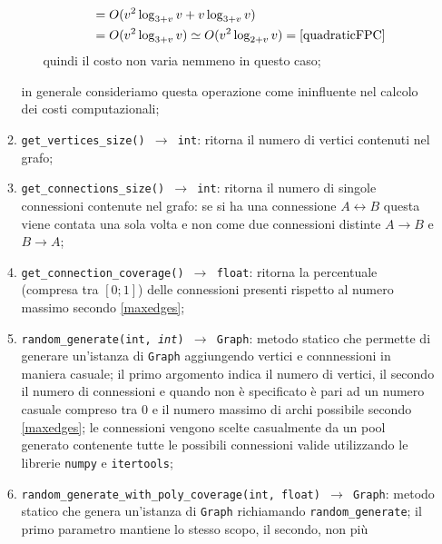 \begin{enumerate}
\begin{enumerate}[resume]
\begin{itemize}
\begin{equation}
\begin{aligned}
                                                                   & = O(v^2\log_{3+v}v+ v\log_{3+v}v)                                   \\
                                                                   & = O(v^2\log_{3+v}v) \simeq O(v^2\log_{2+v}v) = \eqref{quadraticFPC}
                                          \end{aligned}
                                    \end{equation}
                                    quindi il costo non varia nemmeno in questo caso;
                        \end{itemize}
                        in generale consideriamo questa operazione come ininfluente nel calcolo dei costi computazionali;
                  \item \texttt{get\_vertices\_size() $\rightarrow$ int}: ritorna il numero di vertici contenuti nel grafo;
                  \item \texttt{get\_connections\_size() $\rightarrow$ int}: ritorna il numero di singole connessioni contenute nel grafo:
                        se si ha una connessione $A \leftrightarrow B$ questa viene contata una sola volta e non come due connessioni distinte
                        $A \rightarrow B$ e $B \rightarrow A$;
                  \item \texttt{get\_connection\_coverage() $\rightarrow$ float}: ritorna la percentuale (compresa tra $[0;1]$) delle connessioni
                        presenti rispetto al numero massimo secondo \eqref{maxedges};
                  \item \texttt{random\_generate(int, \textit{int}) $\rightarrow$ Graph}: metodo statico che permette di generare un'istanza
                        di \texttt{Graph} aggiungendo vertici e connnessioni in maniera casuale; il primo argomento indica il numero di vertici, il secondo
                        il numero di connessioni e quando non è specificato è pari ad un numero casuale compreso tra 0 e il numero massimo di
                        archi possibile secondo \eqref{maxedges}; le connessioni vengono scelte casualmente da un pool generato contenente tutte le possibili
                        connessioni valide utilizzando le librerie \texttt{numpy} e \texttt{itertools};
                  \item \texttt{random\_generate\_with\_poly\_coverage(int, float) $\rightarrow$ Graph}: metodo statico che genera un'istanza
                        di \texttt{Graph} richiamando \texttt{random\_generate}; il primo parametro mantiene lo stesso scopo, il secondo, non più

\end{enumerate}
\end{enumerate}
